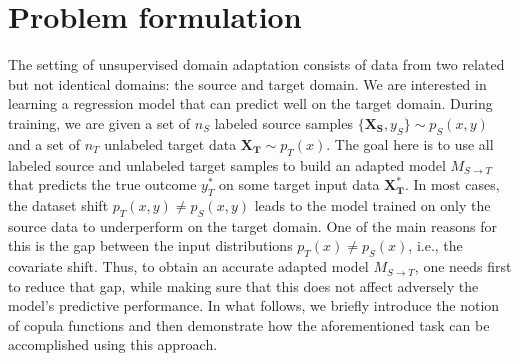 \documentclass{article}
\begin{document}
	\section{Problem formulation}\label{sec:copulas}
		\label{sec:format}
	The setting of unsupervised domain adaptation consists of data from two related but not identical domains: the source and target domain. We are interested in learning a regression model that can predict well on the target domain. During training, we are given a set of $n_S$ labeled source samples $\{\boldsymbol{X_S}, y_S\} \sim p_S(x,y)$ and a set of $n_T$ unlabeled target data $\boldsymbol{X_T} \sim p_T(x)$. The goal here is to use all labeled source and unlabeled target samples to build an adapted model $M_{S \to T}$ that predicts the true outcome $y^*_T$ on some target input data $\boldsymbol{X^*_T} $. In most cases, the dataset shift $p_T(x,y) \neq p_S(x,y)$ leads to the model trained on only the source data to underperform on the target domain. One of the main reasons for this is the gap between the input distributions $p_T(x) \neq p_S(x)$, i.e., the covariate shift. Thus, to obtain an accurate adapted model $M_{S \to T}$, one needs first to reduce that gap, while making sure that this does not affect adversely the model's predictive performance. In what follows, we briefly introduce the notion of copula functions and then demonstrate how the aforementioned task can be accomplished using this approach.  
	
	
\end{document}
